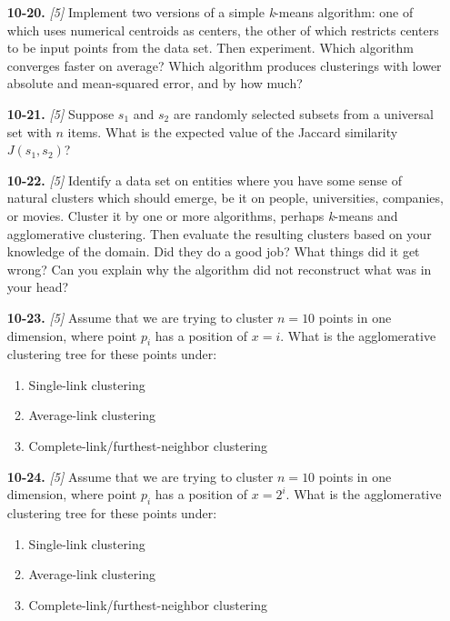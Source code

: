 \documentclass[10pt]{article}
\begin{document}
\begin{enumerate}
  \setcounter{enumi}{19}
  \item[\textbf{10-20.}] \textit{[5]} Implement two versions of a simple \textit{k}-means algorithm: one of which uses numerical centroids as centers, the other of which restricts centers to be input points from the data set. Then experiment. Which algorithm converges faster on average? Which algorithm produces clusterings with lower absolute and mean-squared error, and by how much?
  \item[\textbf{10-21.}] \textit{[5]} Suppose $s_{1}$ and $s_{2}$ are randomly selected subsets from a universal set with $n$ items. What is the expected value of the Jaccard similarity $J(s_{1}, s_{2})$?
  \item[\textbf{10-22.}] \textit{[5]} Identify a data set on entities where you have some sense of natural clusters which should emerge, be it on people, universities, companies, or movies. Cluster it by one or more algorithms, perhaps \textit{k}-means and agglomerative clustering. Then evaluate the resulting clusters based on your knowledge of the domain. Did they do a good job? What things did it get wrong? Can you explain why the algorithm did not reconstruct what was in your head?
  \item[\textbf{10-23.}] \textit{[5]} Assume that we are trying to cluster $n=10$ points in one dimension, where point $p_{i}$ has a position of $x=i$. What is the agglomerative clustering tree for these points under:
  \begin{enumerate}
    \item Single-link clustering
    \item Average-link clustering
    \item Complete-link/furthest-neighbor clustering
  \end{enumerate}
  \item[\textbf{10-24.}] \textit{[5]} Assume that we are trying to cluster $n=10$ points in one dimension, where point $p_{i}$ has a position of $x=2^{i}$. What is the agglomerative clustering tree for these points under:
  \begin{enumerate}
    \item Single-link clustering
    \item Average-link clustering
    \item Complete-link/furthest-neighbor clustering
  \end{enumerate}
  

\end{enumerate}
\end{document}
